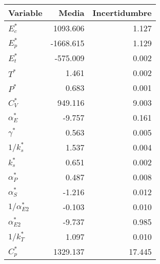 \begin{tabular}{lrr}
\toprule
Variable & Media & Incertidumbre \\
\midrule
$E_c^*$ & 1093.606 & 1.127 \\
$E_p^*$ & -1668.615 & 1.129 \\
$E_t^*$ & -575.009 & 0.002 \\
$T^*$ & 1.461 & 0.002 \\
$P^*$ & 0.683 & 0.001 \\
$C_V^*$ & 949.116 & 9.003 \\
$\alpha_E^*$ & -9.757 & 0.161 \\
$\gamma^*$ & 0.563 & 0.005 \\
$1/k_s^*$ & 1.537 & 0.004 \\
$k_s^*$ & 0.651 & 0.002 \\
$\alpha_P^*$ & 0.487 & 0.008 \\
$\alpha_S^*$ & -1.216 & 0.012 \\
$1/\alpha_{E2}^*$ & -0.103 & 0.010 \\
$\alpha_{E2}^*$ & -9.737 & 0.985 \\
$1/k_T^*$ & 1.097 & 0.010 \\
$C_p^*$ & 1329.137 & 17.445 \\
\bottomrule
\end{tabular}
